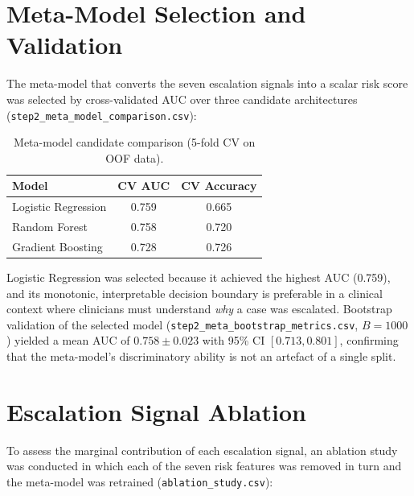 \documentclass[12pt, a4paper]{report}
\begin{document}
  \section{Meta-Model Selection and Validation}
  \label{sec:meta-model}

  The meta-model that converts the seven escalation signals into a scalar risk
  score was selected by cross-validated AUC over three candidate architectures
  (\texttt{step2\_meta\_model\_comparison.csv}):

  \begin{table}[htbp]
    \centering
    \caption{Meta-model candidate comparison (5-fold CV on OOF data).}
    \label{tab:meta-model}
    \begin{tabular}{lSS}
      \toprule
      {Model} & {CV AUC} & {CV Accuracy} \\
      \midrule
      Logistic Regression   & 0.759 & 0.665 \\
      Random Forest         & 0.758 & 0.720 \\
      Gradient Boosting     & 0.728 & 0.726 \\
      \bottomrule
    \end{tabular}
  \end{table}

  Logistic Regression was selected because it achieved the highest AUC (0.759),
  and its monotonic, interpretable decision boundary is preferable in a clinical
  context where clinicians must understand \emph{why} a case was escalated.
  Bootstrap validation of the selected model
  (\texttt{step2\_meta\_bootstrap\_metrics.csv}, $B = 1000$) yielded a mean AUC of
  $0.758 \pm 0.023$ with 95\% CI $[0.713, 0.801]$, confirming that the meta-model's
  discriminatory ability is not an artefact of a single split.

  \section{Escalation Signal Ablation}
  \label{sec:ablation}

  To assess the marginal contribution of each escalation signal, an ablation study
  was conducted in which each of the seven risk features was removed in turn and the
  meta-model was retrained (\texttt{ablation\_study.csv}):
\end{document}
